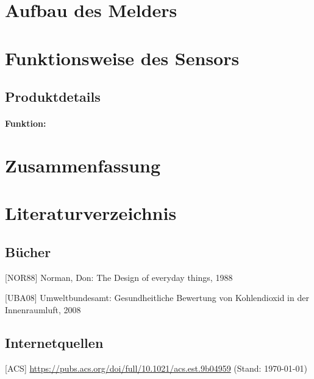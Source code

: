 \documentclass[12pt,a4paper,oneside,english]{article}
\begin{document}
\newpage
\section{Aufbau des Melders}

\newpage
\section{Funktionsweise des Sensors}
\label{lblFunktionsweisesensor}
\subsection{Produktdetails}
\paragraph{Funktion:}
\section{Zusammenfassung}
\newpage

\section{Literaturverzeichnis}
\subsection{Bücher}

[NOR88] Norman, Don: The Design of everyday things, 1988

[UBA08] Umweltbundesamt: Gesundheitliche Bewertung von Kohlendioxid in der Innenraumluft, 2008
\subsection{Internetquellen}

[ACS] \url{https://pubs.acs.org/doi/full/10.1021/acs.est.9b04959} (Stand: \today) 
\end{document}
